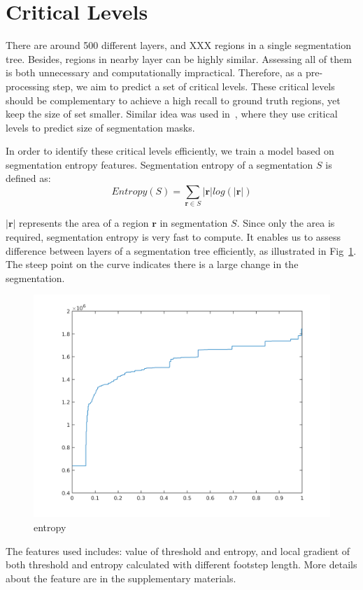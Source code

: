\section{Critical Levels}

There are around 500 different layers, and XXX regions in a single segmentation tree. Besides, regions in nearby layer can be highly similar. Assessing all of them is both unnecessary and computationally impractical. Therefore, as a pre-processing step, we aim to predict a set of critical levels. These critical levels should be complementary to achieve a high recall to ground truth regions, yet keep the size of set smaller. Similar idea was used in~\cite{krahenbuhl2014geodesic}, where they use critical levels to predict size of segmentation masks.

In order to identify these critical levels efficiently, we train a model based on segmentation entropy features. Segmentation entropy of a segmentation $S$ is defined as:
\begin{equation}
Entropy(S) = \sum_{\textbf{r}\in S}{|\textbf{r}|log(|\textbf{r}|)}
\end{equation}

$|\textbf{r}|$ represents the area of a region $\textbf{r}$ in segmentation $S$. Since only the area is required, segmentation entropy is very fast to compute. It enables us to assess difference between layers of a segmentation tree efficiently, as illustrated in Fig~\ref{fig:entropy}. The steep point on the curve indicates there is a large change in the segmentation.

\begin{figure}
\begin{center}
\includegraphics[width=0.5\linewidth]{fig/6046_ucm.png}
\end{center}
\caption{entropy}
\label{fig:entropy}
\end{figure}

The features used includes: value of threshold and entropy, and local gradient of both threshold and entropy calculated with different footstep length. More details about the feature are in the supplementary materials.

  